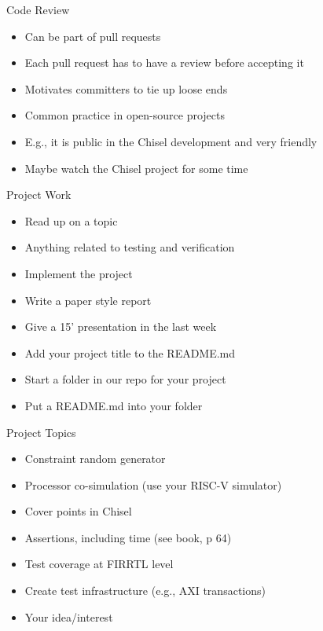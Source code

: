 \begin{frame}[fragile]{Code Review}
\begin{itemize}
\item Can be part of pull requests
\item Each pull request has to have a review before accepting it
\item Motivates committers to tie up loose ends
\item Common practice in open-source projects
\item E.g., it is public in the Chisel development and very friendly
\item Maybe watch the Chisel project for some time
\end{itemize}
\end{frame}


\begin{frame}[fragile]{Project Work}
\begin{itemize}
\item Read up on a topic
\item Anything related to testing and verification
\item Implement the project
\item Write a paper style report
\item Give a 15' presentation in the last week
\item Add your project title to the README.md
\item Start a folder in our repo for your project
\item Put a README.md into your folder
\end{itemize}
\end{frame}

\begin{frame}[fragile]{Project Topics}
\begin{itemize}
\item Constraint random generator
\item Processor co-simulation (use your RISC-V simulator)
\item Cover points in Chisel
\item Assertions, including time (see book, p 64)
\item Test coverage at FIRRTL level
\item Create test infrastructure (e.g., AXI transactions)
\item Your idea/interest
\end{itemize}
\end{frame}


